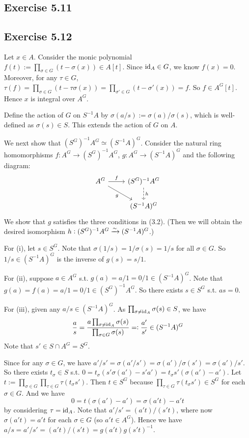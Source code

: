 \documentclass[../A&M.tex]{subfiles}
\begin{document}
\subsection*{Exercise 5.11}

\subsection*{Exercise 5.12}

Let $x\in A$. Consider the monic polynomial $f(t):= \prod_{\sigma \in G} (t - \sigma(x)) \in A[t]$. Since $\operatorname{id}_A \in G$, we know $f(x)=0$. Moreover, for any $\tau\in G$, $\tau(f) = \prod_{\sigma \in G} (t - \tau\sigma(x)) = \prod_{\sigma' \in G} (t - \sigma'(x)) = f$. So $f\in A^G[t]$. Hence $x$ is integral over $A^G$.

Define the action of $G$ on $S^{-1}A$ by $\sigma(a/s) := \sigma(a)/\sigma(s)$, which is well-defined as $\sigma(s) \in S$. This extends the action of $G$ on $A$.

We next show that $(S^G)^{-1}A^G \simeq (S^{-1}A)^G$. Consider the natural ring homomorphisms $f:A^G \to (S^G)^{-1}A^G$, $g:A^G \to (S^{-1}A)^G$ and the following diagram:
$$
\begin{tikzcd}
  A^G \arrow[r, "f"] \arrow[dr, "g"'] & (S^G)^{-1}A^G \arrow[d, dashrightarrow, "h"]   \\
										& (S^{-1}A)^G
\end{tikzcd}
$$
We show that $g$ satisfies the three conditions in (3.2). (Then we will obtain the desired isomorphism $h: (S^G)^{-1}A^G  \xrightarrow{\sim} (S^{-1}A)^G$.)

For (i), let $s \in S^G$. Note that $\sigma(1/s) = 1/\sigma(s) = 1/s$ for all $\sigma\in G$. So $1/s \in (S^{-1}A)^G$ is the inverse of $g(s) = s/1$.

For (ii), suppose $a\in A^G$ s.t. $g(a) = a/1 = 0/1 \in (S^{-1}A)^G$. Note that $g(a) = f(a) = a/1 = 0/1 \in (S^G)^{-1}A^G$. So there exists $s \in S^G$ s.t. $as = 0$.

For (iii), given any $a/s \in (S^{-1}A)^G$. As $\prod_{\sigma \neq \operatorname{id}_A} \sigma(s) \in S$, we have
$$
\frac{a}{s}
= \frac{a \prod_{\sigma \neq \operatorname{id}_A} \sigma(s)}{\prod_{\sigma \in G} \sigma(s)}
=: \frac{a'}{s'} \in (S^{-1}A)^G
$$
Note that $s' \in S \cap A^G = S^G$.

Since for any $\sigma\in G$, we have $a'/s' = \sigma(a'/s') = \sigma(a')/\sigma(s') = \sigma(a')/s'$. So there exists $t_\sigma \in S$ s.t. $0 = t_\sigma(s'\sigma(a') - s'a') =t_\sigma s' (\sigma(a')-a')$. Let $t:=\prod_{\sigma \in G} \prod_{\tau \in G} \tau(t_\sigma s')$. Then $t \in S^G$ because $\prod_{\tau \in G} \tau(t_\sigma s') \in S^G$ for each $\sigma \in G$. And we have
$$
0 = t(\sigma(a')-a') = \sigma(a't) - a't
$$
by considering $\tau=\operatorname{id}_A$. Note that $a'/s' = (a't)/(s't)$, where now $\sigma(a't) = a't$ for each $\sigma \in G$ (so $a't \in A^G$). Hence we have $a/s = a'/s' = (a't)/(s't) = g(a't)g(s't)^{-1}$.
\end{document}
